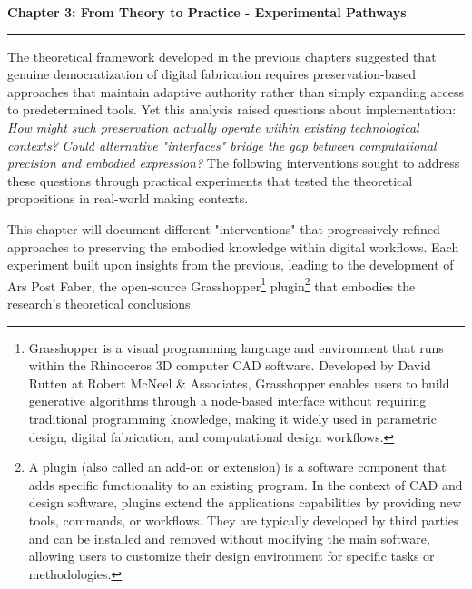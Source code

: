 \clearpage

\setcounter{chapter}{3}
\setcounter{section}{0}


\pagestyle{fancy}
\fancyhf{} %
\fancyfoot[C]{\thepage} %
\renewcommand{\headrulewidth}{0pt}
\renewcommand{\footrulewidth}{0pt}


\noindent
{\Large\textbf{Chapter 3: From Theory to Practice - Experimental Pathways}}
\vspace{0.3cm}
\hrule
\vspace{0.8cm}
\label{ch:experimental_pathways}

\setlength{\parindent}{0pt}
The theoretical framework developed in the previous chapters suggested that genuine democratization of digital fabrication requires preservation-based approaches that maintain adaptive authority rather than simply expanding access to predetermined tools. Yet this analysis raised questions about implementation: \textit{How might such preservation actually operate within existing technological contexts?} \textit{Could alternative "interfaces" bridge the gap between computational precision and embodied expression?} The following interventions sought to address these questions through practical experiments that tested the theoretical propositions in real-world making contexts.

\vspace{0.5cm}

This chapter will document different "interventions" that progressively refined approaches to preserving the embodied knowledge within digital workflows. Each experiment built upon insights from the previous, leading to the development of Ars Post Faber, the open-source Grasshopper\footnote{Grasshopper is a visual programming language and environment that runs within the Rhinoceros 3D computer CAD software. Developed by David Rutten at Robert McNeel \& Associates, Grasshopper enables users to build generative algorithms through a node-based interface without requiring traditional programming knowledge, making it widely used in parametric design, digital fabrication, and computational design workflows.} plugin\footnote{A plugin (also called an add-on or extension) is a software component that adds specific functionality to an existing program. In the context of CAD and design software, plugins extend the applications capabilities by providing new tools, commands, or workflows. They are typically developed by third parties and can be installed and removed without modifying the main software, allowing users to customize their design environment for specific tasks or methodologies.} that embodies the research's theoretical conclusions.

